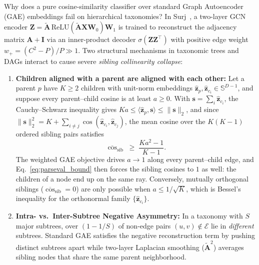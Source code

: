 \documentclass[preprint,12pt]{elsarticle}
\begin{document}
Why does a pure cosine-similarity classifier over standard Graph Autoencoder
(GAE) embeddings fail on hierarchical taxonomies? In
Surj~\cite{www2022ontology}, a two-layer GCN encoder
$\mathbf{Z} = \tilde{\mathbf{A}}\,\text{ReLU}(\tilde{\mathbf{A}}\mathbf{X}\mathbf{W}_0)\mathbf{W}_1$
is trained to reconstruct the adjacency matrix $\mathbf{A} + \mathbf{I}$ via an
inner-product decoder $\sigma(\mathbf{Z}\mathbf{Z}^\top)$ with positive edge
weight $w_+ = (C^2 - P)/P \gg 1$. Two structural mechanisms in taxonomic trees
and DAGs interact to cause severe \emph{sibling collinearity collapse}:
\begin{enumerate}[leftmargin=*,nosep]
  \item \textbf{Children aligned with a parent are aligned with each other:}
    Let a parent $p$ have $K \ge 2$ children with unit-norm embeddings
    $\hat{\mathbf{z}}_p, \hat{\mathbf{z}}_{c_i} \in \mathbb{S}^{D-1}$, and
    suppose every parent--child cosine is at least $a \ge 0$. With
    $\mathbf{s} = \sum_{i} \hat{\mathbf{z}}_{c_i}$, the Cauchy--Schwarz
    inequality gives $Ka \le \langle \hat{\mathbf{z}}_p, \mathbf{s} \rangle \le
    \|\mathbf{s}\|_2$, and since $\|\mathbf{s}\|_2^2 = K + \sum_{i \ne j}
    \cos(\hat{\mathbf{z}}_{c_i}, \hat{\mathbf{z}}_{c_j})$, the mean cosine
    over the $K(K-1)$ ordered sibling pairs satisfies
    \begin{equation}
    \overline{\cos}_{\text{sib}} \;\ge\; \frac{K a^2 - 1}{K - 1}.
    \label{eq:parseval_bound}
    \end{equation}
    The weighted GAE objective drives $a \to 1$ along every parent--child
    edge, and Eq.~\eqref{eq:parseval_bound} then forces the sibling cosines to
    $1$ as well: the children of a node end up on the same ray. Conversely,
    mutually orthogonal siblings ($\overline{\cos}_{\text{sib}} = 0$) are only
    possible when $a \le 1/\sqrt{K}$, which is Bessel's inequality for the
    orthonormal family $\{\hat{\mathbf{z}}_{c_i}\}$.
  \item \textbf{Intra- vs.\ Inter-Subtree Negative Asymmetry:} In a taxonomy
    with $S$ major subtrees, over $(1 - 1/S)$ of non-edge pairs $(u,v) \notin
    \mathcal{E}$ lie in \emph{different} subtrees. Standard GAE satisfies the
    negative reconstruction term by pushing distinct subtrees apart while
    two-layer Laplacian smoothing ($\tilde{\mathbf{A}}^2$) averages sibling
    nodes that share the same parent neighborhood.
\end{enumerate}
\end{document}
